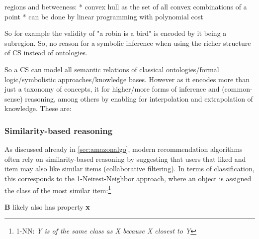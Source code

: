 regions and betweeness:
* convex hull as the set of all convex combinations of a point
* can be done by linear programming with polynomial cost


\vspace{4ex}


So for example the validity of "a robin is a bird" is encoded by it being a subregion. So, no reason for a symbolic inference when using the richer structure of CS instead of ontologies.

So a CS can model all semantic relations of classical ontologies/formal logic/symbolistic approaches/knowledge bases. However as it encodes more than just a taxonomy of concepts, it for higher/more forms of inference and (common-sense) reasoning, among others by enabling for interpolation and extrapolation of knowledge. These are:

\subsubsection*{Similarity-based reasoning}

\label{sec:similaritybasedreasoning}

As discussed already in \autoref{sec:amazonalgo}, modern recommendation algorithms often rely on similarity-based reasoning by suggesting that users that liked and item may also like similar items (collaborative filtering). In terms of classification, this corresponds to the 1-Neirest-Neighbor approach, where an object is assigned the class of the most similar item:\footnote{1-NN: \textit{Y is of the same class as X because X closest to Y}}

\noindent
\begin{minipage}{.6\textwidth}
\end{minipage}%
\begin{minipage}{.4\textwidth}
             {\textbf{B} likely also has property \textbf{x}}
\end{minipage}%

